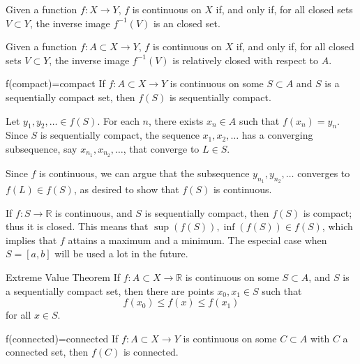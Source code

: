 
\begin{thm}{}{}
	Given a function \(f\colon X \to Y\), \(f\) is continuous on \(X\) if, and only if, for all closed sets \(V \subset Y\), the inverse image \(f^{-1}(V)\) is an closed set.
\end{thm}

\begin{thm}{}{}
	Given a function \(f\colon A \subset X \to Y\), \(f\) is continuous on \(X\) if, and only if, for all closed sets \(V \subset Y\), the inverse image \(f^{-1}(V)\) is relatively closed with respect to \(A\).
\end{thm}

\begin{thm}{}{f(compact)=compact}
	If \(f\colon A \subset X \to Y\) is continuous on some \(S \subset A\) and \(S\) is a sequentially compact set, then \(f(S)\) is sequentially compact.
\end{thm}

\begin{dem}{}{}
	Let \(y_1, y_2, \dots \in f(S)\). For each \(n\), there exists \(x_n \in A\) such that \(f(x_n) = y_n\). Since \(S\) is sequentially compact, the sequence \(x_1, x_2, \dots\) has a converging subsequence, say \(x_{n_1}, x_{n_2}, \dots\), that converge to \(L \in S\).

	Since \(f\) is continuous, we can argue that the subsequence \(y_{n_1}, y_{n_2}, \dots\) converges to \(f(L) \in f(S)\), as desired to show that \(f(S)\) is continuous.
\end{dem}

If \(f\colon S \to \mathbb{R}\) is continuous, and \(S\) is sequentially compact, then \(f(S)\) is compact; thus it is closed. This means that \(\sup(f(S)), \inf(f(S)) \in f(S)\), which implies that \(f\) attains a maximum and a minimum. The especial case when \(S = [a, b]\) will be used a lot in the future.

\begin{thm}{Extreme Value Theorem}{}
	If \(f\colon A \subset X \to \mathbb{R}\) is continuous on some \(S \subset A\), and \(S\) is a sequentially compact set, then there are points \(x_0, x_1 \in S\) such that \[
		f(x_0) \leq f(x) \leq f(x_1)
	\] for all \(x \in S\).
\end{thm}

\begin{thm}{}{f(connected)=connected}
	If \(f\colon A \subset X \to Y\) is continuous on some \(C \subset A\) with \(C\) a connected set, then \(f(C)\) is connected.
\end{thm}


